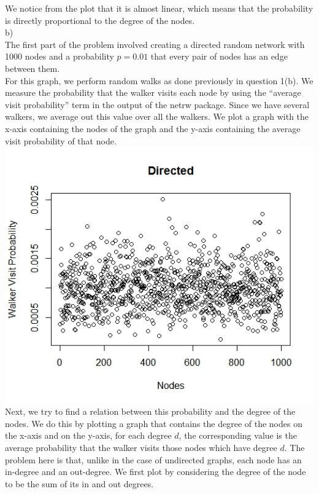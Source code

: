 \documentclass{article}
\begin{document}
We notice from the plot that it is almost linear, which means that the probability is directly proportional to the 
degree of the nodes.\\

b)\\
The first part of the problem involved creating a directed random network 
with 1000 nodes and a probability $p=0.01$ that every pair of nodes has an edge between them. \\
For this graph, we perform random walks as done previously in question 1(b).
We measure the probability that the walker visits each node by using the ``average visit probability'' term
in the output of the netrw package. Since we have several walkers, we average out this value over all the walkers.
We plot a graph with the x-axis containing the nodes of the graph and the y-axis containing the 
average visit probability of that node.\\
\includegraphics[scale=0.4]{p3c} \\
Next, we try to find a relation between this probability and the degree of the nodes.
We do this by plotting a graph that contains the degree of the nodes on the x-axis and on the y-axis,
for each degree $d$, the corresponding value is the average probability that the walker visits those nodes which
have degree $d$. The problem here is that, unlike in the case of undirected graphs, each node
has an in-degree and an out-degree. We first plot by considering the degree of the node to be the sum of its in and out 
degrees.\\
\end{document}
